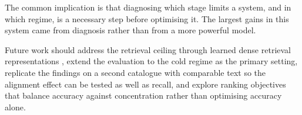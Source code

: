 \documentclass[10pt,twocolumn]{article}
\begin{document}
The common implication is that diagnosing which stage limits a system, and in
which regime, is a necessary step before optimising it. The largest gains in
this system came from diagnosis rather than from a more powerful model.

Future work should address the retrieval ceiling through learned dense
retrieval representations \citep{huang2020embedding}, extend the evaluation to
the cold regime as the primary setting, replicate the findings on a second
catalogue with comparable text so the alignment effect can be tested as well
as recall, and explore ranking objectives that balance accuracy against
concentration rather than optimising accuracy alone.

\newpage

\end{document}
